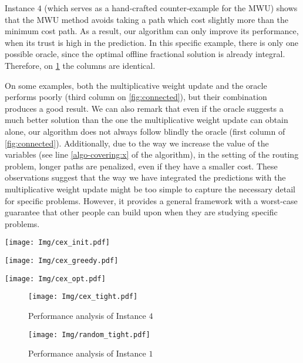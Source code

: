 Instance $4$ (which serves as a hand-crafted counter-example for the MWU) shows that the MWU method avoids taking a path which cost slightly more than the minimum cost path. As a result, our algorithm can only improve its performance, when its trust is high in the prediction. In this specific example, there is only one possible oracle, since the optimal offline fractional solution is already integral. Therefore, on \cref{fig:cex-perf} the columns are identical.

On some examples, both the multiplicative weight update and the oracle performs poorly (third column on \cref{fig:connected}), but their combination produces a good result. We can also remark that even if the oracle suggests a much better solution than the one the multiplicative weight update can obtain alone, our algorithm does not always follow blindly the oracle (first column of \cref{fig:connected}). Additionally, due to the way we increase the value of the variables (see line \ref{algo-covering:x} of the algorithm), in the setting of the routing problem, longer paths are penalized, even if they have a smaller cost. These observations suggest that the way we have integrated the predictions with the multiplicative weight update might be too simple to capture the necessary detail for specific problems. However, it provides a general framework with a worst-case guarantee that other people can build upon when they are studying specific problems.

{
    \begin{minipage}{0.3\textwidth}
        \texttt{[image: Img/cex\_init.pdf]}
    \end{minipage}
    \begin{minipage}{0.3\textwidth}
        \texttt{[image: Img/cex\_greedy.pdf]}
    \end{minipage}
    \begin{minipage}{0.3\textwidth}
        \texttt{[image: Img/cex\_opt.pdf]}
    \end{minipage}
    \label{fig:cex}
}

\begin{figure}[!ht]
    \centering
    \texttt{[image: Img/cex\_tight.pdf]}
    \caption{Performance analysis of Instance $4$}
    \label{fig:cex-perf}
\end{figure}


\begin{figure}[!ht]
    \centering
    \texttt{[image: Img/random\_tight.pdf]}
    \caption{Performance analysis of Instance $1$}
    \label{fig:random}
\end{figure}


